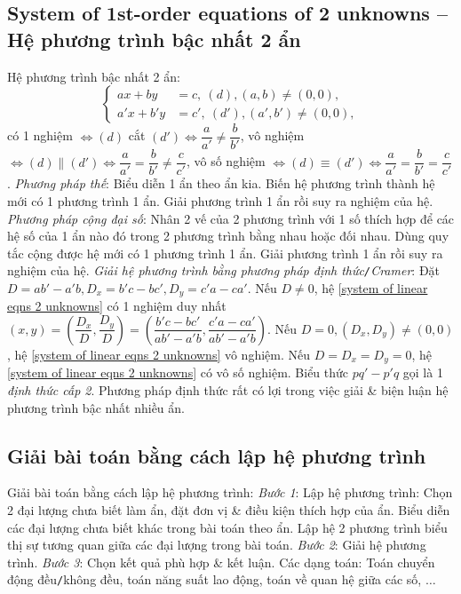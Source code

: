 \documentclass{article}
\begin{document}
\subsection{System of 1st-order equations of 2 unknowns -- Hệ phương trình bậc nhất 2 ẩn}
 Hệ phương trình bậc nhất 2 ẩn:
\begin{equation}
	\label{system of linear eqns 2 unknowns}
	\left\{\begin{split}
		ax + by &= c,\ (d),(a,b)\ne(0,0),\\
		a'x + b'y &= c',\ (d'),(a',b')\ne(0,0),
	\end{split}\right.
\end{equation}
có 1 nghiệm $\Leftrightarrow(d)$ cắt $(d')\Leftrightarrow\dfrac{a}{a'}\ne\dfrac{b}{b'}$, vô nghiệm $\Leftrightarrow(d)\parallel(d')\Leftrightarrow\dfrac{a}{a'} = \dfrac{b}{b'}\ne\dfrac{c}{c'}$, vô số nghiệm $\Leftrightarrow(d)\equiv(d')\Leftrightarrow\dfrac{a}{a'} = \dfrac{b}{b'} = \dfrac{c}{c'}$.  \textit{Phương pháp thế}: Biểu diễn 1 ẩn theo ẩn kia. Biến hệ phương trình thành hệ mới có 1 phương trình 1 ẩn. Giải phương trình 1 ẩn rồi suy ra nghiệm của hệ.  \textit{Phương pháp cộng đại số}: Nhân 2 vế của 2 phương trình với 1 số thích hợp để các hệ số của 1 ẩn nào đó trong 2 phương trình bằng nhau hoặc đối nhau. Dùng quy tắc cộng được hệ mới có 1 phương trình 1 ẩn. Giải phương trình 1 ẩn rồi suy ra nghiệm của hệ.  \textit{Giải hệ phương trình bằng phương pháp định thức{\tt/}Cramer}: Đặt $D = ab' - a'b,D_x = b'c - bc',D_y = c'a - ca'$. Nếu $D\ne0$, hệ \eqref{system of linear eqns 2 unknowns} có 1 nghiệm duy nhất $(x,y) = \left(\dfrac{D_x}{D},\dfrac{D_y}{D}\right) = \left(\dfrac{b'c - bc'}{ab' - a'b},\dfrac{c'a - ca'}{ab' - a'b}\right)$. Nếu $D = 0,(D_x,D_y)\ne(0,0)$, hệ \eqref{system of linear eqns 2 unknowns} vô nghiệm. Nếu $D = D_x = D_y = 0$, hệ \eqref{system of linear eqns 2 unknowns} có vô số nghiệm. Biểu thức $pq' - p'q$ gọi là 1 \textit{định thức cấp 2}. Phương pháp định thức rất có lợi trong việc giải \& biện luận hệ phương trình bậc nhất nhiều ẩn.

\subsection{Giải bài toán bằng cách lập hệ phương trình}
 {\sf Giải bài toán bằng cách lập hệ phương trình:} \textit{Bước 1}: Lập hệ phương trình: Chọn 2 đại lượng chưa biết làm ẩn, đặt đơn vị \& điều kiện thích hợp của ẩn. Biểu diễn các đại lượng chưa biết khác trong bài toán theo ẩn. Lập hệ 2 phương trình biểu thị sự tương quan giữa các đại lượng trong bài toán. \textit{Bước 2}: Giải hệ phương trình. \textit{Bước 3}: Chọn kết quả phù hợp \& kết luận.  Các dạng toán: Toán chuyển động đều{\tt/}không đều, toán năng suất lao động, toán về quan hệ giữa các số, $\ldots$
\end{document}
